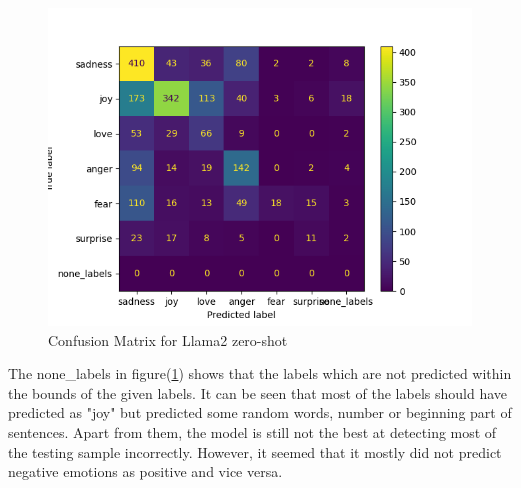 \begin{figure}[h!]
    \centerline{\includegraphics[scale=0.6]{Figures/conf_metrix_llama2_no_epochs.png}}
    \caption{Confusion Matrix for Llama2 zero-shot}
    \label{fig:conf_matrix_llama2}
\end{figure}

The none\_labels in figure(\ref{fig:conf_matrix_llama2}) shows that the labels which are not predicted within the bounds of the given labels. It can be seen that most of the labels should have predicted as "joy" but predicted some random words, number or beginning part of sentences. Apart from them, the model is still not the best at detecting most of the testing sample incorrectly. However, it seemed that it mostly did not predict negative emotions as positive and vice versa.